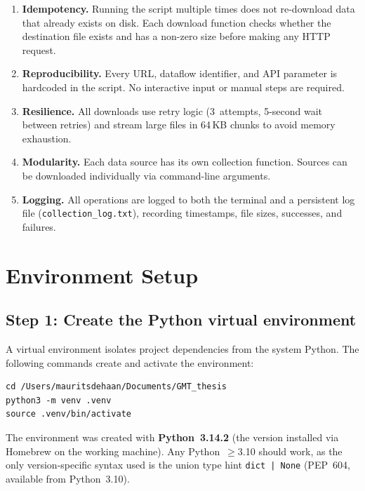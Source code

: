 \documentclass[12pt,a4paper]{article}
\begin{document}
\begin{enumerate}
    \item \textbf{Idempotency.} Running the script multiple times does not re-download data that already exists on disk.
    Each download function checks whether the destination file exists and has a non-zero size before making any HTTP request.
    \item \textbf{Reproducibility.} Every URL, dataflow identifier, and API parameter is hardcoded in the script.
    No interactive input or manual steps are required.
    \item \textbf{Resilience.} All downloads use retry logic (3~attempts, 5-second wait between retries) and stream large files in 64\,KB chunks to avoid memory exhaustion.
    \item \textbf{Modularity.} Each data source has its own collection function.
    Sources can be downloaded individually via command-line arguments.
    \item \textbf{Logging.} All operations are logged to both the terminal and a persistent log file (\texttt{collection\_log.txt}), recording timestamps, file sizes, successes, and failures.
\end{enumerate}


\section{Environment Setup}\label{sec:environment}

\subsection{Step 1: Create the Python virtual environment}

A virtual environment isolates project dependencies from the system Python.
The following commands create and activate the environment:

\begin{lstlisting}[style=shellstyle,caption={Creating the virtual environment}]
cd /Users/mauritsdehaan/Documents/GMT_thesis
python3 -m venv .venv
source .venv/bin/activate
\end{lstlisting}

The environment was created with \textbf{Python~3.14.2} (the version installed via Homebrew on the working machine).
Any Python~$\geq$3.10 should work, as the only version-specific syntax used is the union type hint \texttt{dict | None} (PEP~604, available from Python~3.10).
\end{document}
